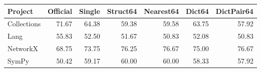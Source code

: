 \begin{tabular}{lrrrrrr}
\toprule
Project & Official & Single & Struct64 & Nearest64 & Dict64 & DictPair64 \\
\midrule
Collections & 71.67 & 64.38 & 59.38 & 59.58 & 63.75 & 57.92 \\
Lang & 55.83 & 52.50 & 51.67 & 50.83 & 52.08 & 50.83 \\
NetworkX & 68.75 & 73.75 & 76.25 & 76.67 & 75.00 & 76.67 \\
SymPy & 50.42 & 59.17 & 60.00 & 60.00 & 58.33 & 57.92 \\
\bottomrule
\end{tabular}
